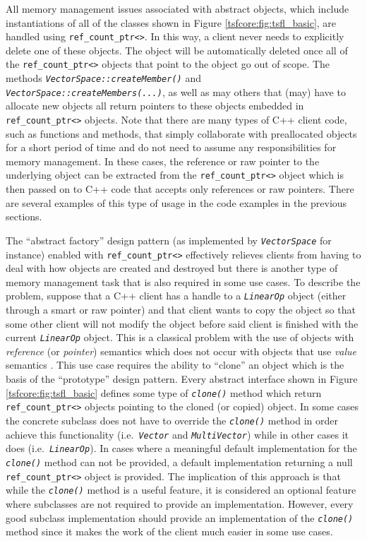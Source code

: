 \documentclass[10pt,fleqn]{article}
\begin{document}
All memory management issues associated with abstract objects, which
include instantiations of all of the classes shown in Figure
\ref{tsfcore:fig:tsfl_basic}, are handled using
\texttt{ref\_count\_ptr<>}.  In this way, a client never needs to
explicitly delete one of these objects.  The object will be
automatically deleted once all of the
\texttt{ref\_count\_ptr<>} objects that point to the object go out of
scope.  The methods
\texttt{\textit{VectorSpace\-::createMember()}} and
\texttt{\textit{VectorSpace\-::createMembers(...)}}, as well as may others that
(may) have to allocate new objects all return pointers to these
objects embedded in \texttt{ref\_count\_ptr<>} objects.  Note that
there are many types of C++ client code, such as functions and
methods, that simply collaborate with preallocated objects for a short
period of time and do not need to assume any responsibilities for
memory management.  In these cases, the reference or raw pointer to the
underlying object can be extracted from the
\texttt{ref\_count\_ptr<>} object which is then passed on to C++ code
that accepts only references or raw pointers.  There are several
examples of this type of usage in the code examples in the previous
sections.

The ``abstract factory'' design pattern (as implemented by
\texttt{\textit{VectorSpace}} for instance) enabled with \texttt{ref\_count\_ptr<>}
effectively relieves clients from having to deal with how objects are
created and destroyed but there is another type of memory management
task that is also required in some use cases.  To describe the
problem, suppose that a C++ client has a handle to a
\texttt{\textit{LinearOp}} object (either through a smart or raw
pointer) and that client wants to copy the object so that some other
client will not modify the object before said client is finished with
the current \texttt{\textit{LinearOp}} object.  This is a classical
problem with the use of objects with {\em reference} (or {\em
pointer}) semantics which does not occur with objects that use {\em
value} semantics \cite{ref:stroustrup_1997}.  This use case requires
the ability to ``clone'' an object which is the basis of the
``prototype'' design pattern.  Every abstract interface shown in
Figure \ref{tsfcore:fig:tsfl_basic} defines some type of
\texttt{\textit{clone()}} method which return
\texttt{ref\_count\_ptr<>} objects pointing to the cloned (or copied)
object.  In some cases the concrete subclass does not have to
override the \texttt{\textit{clone()}} method in order achieve this
functionality (i.e.~\texttt{\textit{Vector}} and
\texttt{\textit{MultiVector}}) while in other cases it does
(i.e.~\texttt{\textit{LinearOp}}).  In cases
where a meaningful default implementation for the
\texttt{\textit{clone()}} method can not be provided, a default implementation
returning a null \texttt{ref\_count\_ptr<>} object is provided.
The implication of this approach is that while the \texttt{\textit{clone()}}
method is a useful feature, it is considered an optional feature where
subclasses are not required to provide an implementation.  However,
every good subclass implementation should provide an implementation of
the \texttt{\textit{clone()}} method since it makes the work of the client much
easier in some use cases.
	
\end{document}
